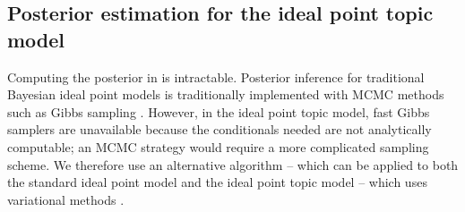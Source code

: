 









\subsection*{Posterior estimation for the ideal point topic model}
\label{sec:inference}
Computing the posterior in  is intractable.  Posterior
inference for traditional Bayesian ideal point models is traditionally
implemented with MCMC methods such as Gibbs sampling
\cite{johnson:1999ch6,jackman:2001,martin:2002,clinton:2004}.
However, in the ideal point topic model, fast Gibbs samplers are
unavailable because the conditionals needed are not analytically
computable; an MCMC strategy would require a more complicated sampling
scheme. We therefore use an alternative algorithm -- which can be applied
to both the standard ideal point model and the ideal point topic model
-- which uses variational methods \cite{jordan:1999}.

